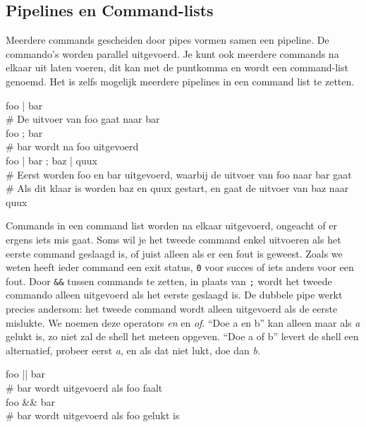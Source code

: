 \subsection{Pipelines en Command-lists}\label{pipelines-en-command-lists}

Meerdere commands gescheiden door pipes vormen samen een pipeline. De commando's worden parallel uitgevoerd. Je kunt ook meerdere commands na elkaar uit laten voeren, dit kan met de puntkomma en wordt een command-list genoemd. Het is zelfs mogelijk meerdere pipelines in een command list te zetten.

\begin{bash}
\userprompt[~] foo | bar\\
\# De uitvoer van foo gaat naar bar\\

\userprompt[~] foo ; bar\\
\# bar wordt na foo uitgevoerd\\

\userprompt[~] foo | bar ; baz | quux\\
\# Eerst worden foo en bar uitgevoerd, waarbij de uitvoer van foo naar bar gaat\\
\# Als dit klaar is worden baz en quux gestart, en gaat de uitvoer van baz naar quux\\
\end{bash}

Commands in een command list worden na elkaar uitgevoerd, ongeacht of er ergens iets mis gaat. Soms wil je het tweede command enkel uitvoeren als het eerste command geslaagd is, of juist alleen als er een fout is geweest. Zoals we weten heeft ieder command een exit status, \texttt{0} voor succes of iets anders voor een fout. Door \texttt{\&\&} tussen commands te zetten, in plaats van \texttt{;} wordt het tweede commando alleen uitgevoerd als het eerste geslaagd is. De dubbele pipe \texttt{\textbar{}\textbar{}} werkt precies andersom: het tweede command wordt alleen uitgevoerd als de eerste mislukte. We noemen deze operators \emph{en} en \emph{of}. ``Doe a en b'' kan alleen maar als \emph{a} gelukt is, zo niet zal de shell het meteen opgeven. ``Doe a of b'' levert de shell een alternatief, probeer eerst \emph{a}, en als dat niet lukt, doe dan \emph{b}.

\begin{bash}
\userprompt[~] foo || bar\\
\# bar wordt uitgevoerd als foo faalt\\

\userprompt[~] foo \&\& bar\\
\# bar wordt uitgevoerd als foo gelukt is\\
\end{bash}

